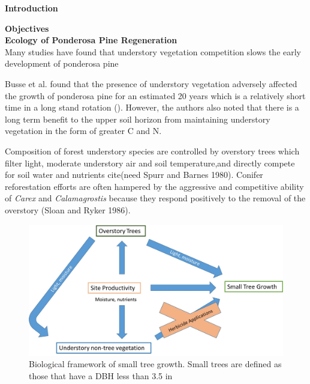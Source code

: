 \documentclass[11pt, letterpaper, fleqn]{article}
\begin{document}

\newpage
{}
\setcounter{page}{1}
\large 
\begin{center}
\textbf{Introduction}\\[1pt]
\end{center}
\normalsize
\noindent 
{}
\textbf{Objectives}\\[1pt]
\textbf{Ecology of Ponderosa Pine Regeneration}\\[1pt]


Many studies have found that understory vegetation competition slows the early development of ponderosa pine  

Busse et al. found that the presence of understory vegetation adversely affected the growth of ponderosa pine for an estimated 20 years which is a relatively short time in a long stand rotation (\cite{Busse1996}). However, the authors also noted that there is a long term benefit to the upper soil horizon from maintaining understory vegetation in the form of greater C and N.

Composition of forest understory species are controlled by overstory trees which filter light, moderate understory air and soil temperature,and directly compete for soil water and nutrients cite(need Spurr and Barnes 1980). Conifer reforestation efforts are often hampered by the aggressive and competitive ability of \emph{Carex} and \emph{Calamagrostis} because they respond positively to the removal of the overstory (Sloan and Ryker 1986). 





\begin{figure}[ht]
\begin{center}
    \includegraphics[width=160mm]{comp_flowchart.jpg}
    \caption{Biological framework of small tree growth. Small trees are defined as those that have a DBH less than 3.5 in}
    \label{fig:chart}
\end{center}
\end{figure}
\end{document}
